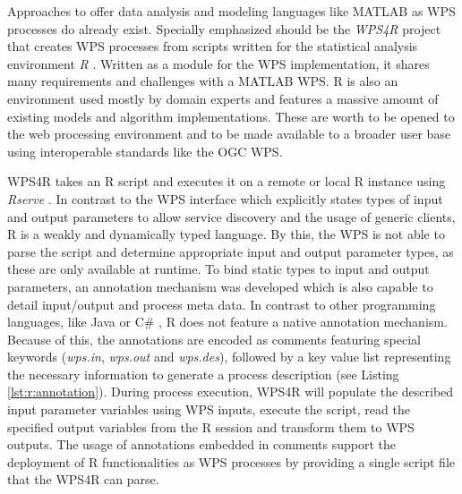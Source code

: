 	Approaches to offer data analysis and modeling languages like MATLAB as \ac{WPS} processes do already exist. Specially emphasized should be the \emph{WPS4R} \citep{wps4r} project that creates WPS processes from scripts written for the statistical analysis environment \emph{R} \citep{gnur}. Written as a module for the \ftn \ac{WPS} implementation, it shares many requirements and challenges with a MATLAB WPS. R is also an environment used mostly by domain experts and features a massive amount of existing models and algorithm implementations. These are worth to be opened to the web processing environment and to be made available to a broader user base using interoperable standards like the \ac{OGC} \acl{WPS}.

	

	WPS4R takes an R script and executes it on a remote or local R instance using \emph{Rserve} \citep{rserve}. In contrast to the \ac{WPS} interface which explicitly states types of input and output parameters to allow service discovery and the usage of generic clients, R is a weakly and dynamically typed language. By this, the \ac{WPS} is not able to parse the script and determine appropriate input and output parameter types, as these are only available at runtime. To bind static types to input and output parameters, an annotation mechanism was developed which is also capable to detail input/output and process meta data. In contrast to other programming languages, like Java \citep{jsr175} or C\# \citep{ecma335}, R does not feature a native annotation mechanism. Because of this, the annotations are encoded as comments featuring special keywords (\emph{wps.in}, \emph{wps.out} and \emph{wps.des}), followed by a key value list representing the necessary information to generate a process description (see Listing \ref{lst:r:annotation}). During process execution, WPS4R will populate the described input parameter variables using \ac{WPS} inputs, execute the script, read the specified output variables from the R session and transform them to WPS outputs. The usage of annotations embedded in comments support the deployment of R functionalities as WPS processes by providing a single script file that the WPS4R can parse.

